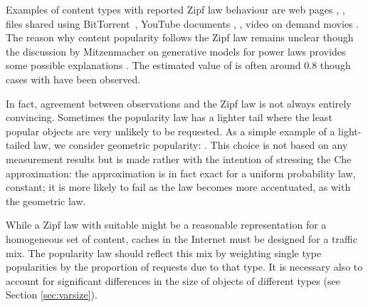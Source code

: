 \documentclass{amsart}
\begin{document}
Examples of content types with reported Zipf law behaviour are web pages \cite{Breslau99},  \cite{Mahanti00}, files shared using BitTorrent~\cite{FRRS12}, YouTube documents \cite{Gill07},  \cite{Cha07},  video on demand movies  \cite{Yu06}. 
The reason why content popularity follows the Zipf law remains unclear though the discussion by Mitzenmacher on generative models for power laws provides some possible explanations \cite{Mitzenmacher03}. The estimated value of  is often around 0.8 though cases with  have been observed. 

In fact, agreement between observations and the Zipf law is not always entirely convincing. Sometimes the popularity law has a lighter tail where the least popular objects are very unlikely to be requested. As a simple example of a light-tailed law, we consider geometric popularity: . This choice is not based on any measurement results but is made rather with the intention of stressing the Che approximation: the approximation is in fact exact for a uniform probability law, constant; it is more likely to fail as the law becomes more accentuated, as with the geometric law.

While a Zipf  law with suitable  might be a reasonable representation for a homogeneous set of content, caches in the Internet must be designed for a traffic mix. The popularity law should reflect this mix by weighting single type popularities by the proportion of requests due to that type. It is necessary also to account for significant differences in the size of objects of different types (see Section \ref{sec:varsize}). 
\end{document}
